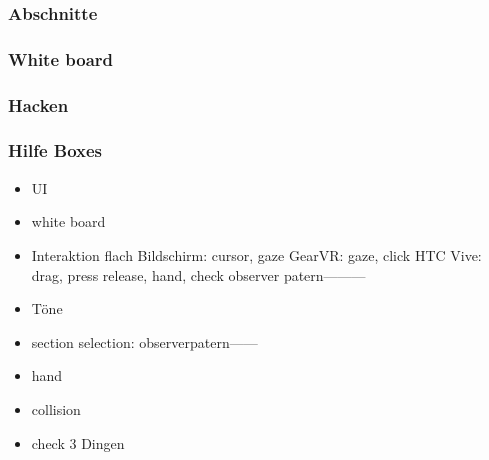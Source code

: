   \subsubsection{Abschnitte}
  
  \subsubsection{White board}
  
  \subsubsection{Hacken}
  
  \subsubsection{Hilfe Boxes}
  
\begin{itemize}
\item UI
\item white board
\item Interaktion
\subitem flach Bildschirm: cursor, gaze
\subitem GearVR: gaze, click
\subitem HTC Vive: drag, press release, hand, check
\subitem observer patern---------
\item Töne
\item section selection: observerpatern------
\item hand
\item collision
\item check 3 Dingen
\end{itemize}